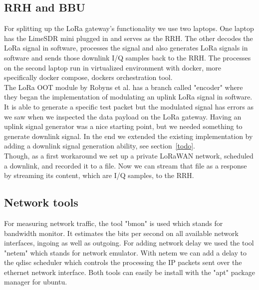 \subsection{RRH and BBU}
For splitting up the LoRa gateway's functionality we use two laptops. 
One laptop has the LimeSDR mini plugged in and serves as the RRH. The other decodes the LoRa
signal in software, processes the signal and also generates LoRa signals in software and sends those downlink I/Q samples back to the RRH.
The processes on the second laptop run in virtualized environment with docker, more specifically docker compose, dockers orchestration tool.
\\
The LoRa OOT module by Robyns et al. has a branch called "encoder" where they began the implementation of modulating an uplink LoRa signal in software.
It is able to generate a specific test packet but the modulated signal has errors as we saw when we inspected the data payload on the LoRa gateway.
Having an uplink signal generator was a nice starting point, but we needed something to generate downlink signal. In the end we extended the existing implementation
by adding a downlink signal generation ability, see section~\ref{todo}.
\\
Though, as a first workaround we set up a private LoRaWAN network, scheduled a downlink, and recorded it to a file. Now we can stream that file as a response by streaming its content,
which are I/Q samples, to the RRH.


\subsection{Network tools}
For measuring network traffic, the tool "bmon" is used which stands for bandwidth monitor.
It estimates the bits per second on all available network interfaces, ingoing as well as outgoing. 
For adding network delay we used the tool "netem" which stands for network emulator. With netem we can add a delay to the qdisc scheduler
which controls the processing the IP packets sent over the ethernet network interface.
Both tools can easily be install with the "apt" package manager for ubuntu.
\newpage



